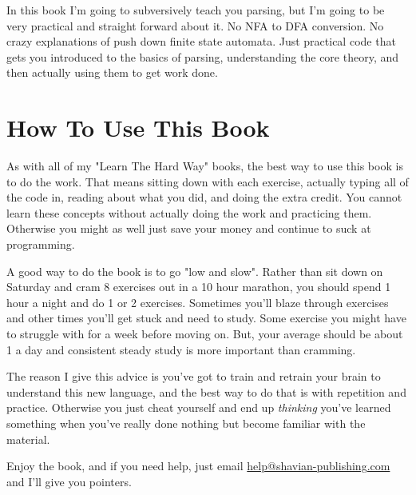 In this book I'm going to subversively teach you parsing, but I'm going
to be very practical and straight forward about it.  No NFA to DFA conversion.
No crazy explanations of push down finite state automata.  Just practical
code that gets you introduced to the basics of parsing, understanding the
core theory, and then actually using them to get work done.


\section{How To Use This Book}

As with all of my "Learn The Hard Way" books, the best way to use this
book is to do the work.  That means sitting down with each exercise,
actually typing all of the code in, reading about what you did, and
doing the extra credit.  You cannot learn these concepts without
actually doing the work and practicing them.  Otherwise you might
as well just save your money and continue to suck at programming.

A good way to do the book is to go "low and slow".  Rather than
sit down on Saturday and cram 8 exercises out in a 10 hour marathon,
you should spend 1 hour a night and do 1 or 2 exercises.  Sometimes
you'll blaze through exercises and other times you'll get stuck and
need to study.  Some exercise you might have to struggle with for
a week before moving on.  But, your average should be about 1 a day
and consistent steady study is more important than cramming.

The reason I give this advice is you've got to train and retrain
your brain to understand this new language, and the best way to
do that is with repetition and practice.  Otherwise you just cheat
yourself and end up \emph{thinking} you've learned something when
you've really done nothing but become familiar with the material.

Enjoy the book, and if you need help, just email \href{mailto:help@shavian-publishing.com}{help@shavian-publishing.com}
and I'll give you pointers.

